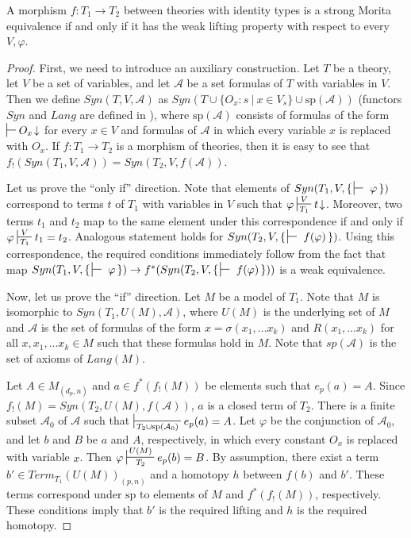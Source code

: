 \documentclass[reqno]{amsart}
\theoremstyle{definition}
\theoremstyle{remark}
\numberwithin{figure}{section}
\begin{document}
\begin{prop}
A morphism $f : T_1 \to T_2$ between theories with identity types is a strong Morita equivalence if and only if it has the weak lifting property with respect to every $V,\varphi$.
\end{prop}
\begin{proof}
First, we need to introduce an auxiliary construction.
Let $T$ be a theory, let $V$ be a set of variables, and let $\mathcal{A}$ be a set formulas of $T$ with variables in $V$.
Then we define $Syn(T,V,\mathcal{A})$ as $Syn(T \cup \{ O_x : s\ |\ x \in V_s \} \cup \mathrm{sp}(\mathcal{A}))$ (functors $Syn$ and $Lang$ are defined in \cite{alg-models}),
where $\mathrm{sp}(\mathcal{A})$ consists of formulas of the form $\sststile{}{} O_x\!\downarrow$ for every $x \in V$
and formulas of $\mathcal{A}$ in which every variable $x$ is replaced with $O_x$.
If $f : T_1 \to T_2$ is a morphism of theories, then it is easy to see that $f_!(Syn(T_1,V,\mathcal{A})) = Syn(T_2,V,f(\mathcal{A}))$.

Let us prove the ``only if'' direction.
Note that elements of $Syn(T_1, V, \{\,\sststile{}{}~\varphi\,\})$ correspond to terms $t$ of $T_1$ with variables in $V$ such that $\varphi \sststile{T_1}{V} t\!\downarrow$.
Moreover, two terms $t_1$ and $t_2$ map to the same element under this correspondence if and only if $\varphi \sststile{T_1}{V} t_1 = t_2$.
Analogous statement holds for $Syn(T_2, V, \{\,\sststile{}{}~f(\varphi)\,\})$.
Using this correspondence, the required conditions immediately follow from the fact that
map $Syn(T_1, V, \{\,\sststile{}{}~\varphi\,\}) \to f^*(Syn(T_2, V, \{\,\sststile{}{}~f(\varphi)\,\}))$ is a weak equivalence.

Now, let us prove the ``if'' direction.
Let $M$ be a model of $T_1$.
Note that $M$ is isomorphic to $Syn(T_1, U(M), \mathcal{A})$, where $U(M)$ is the underlying set of $M$ and $\mathcal{A}$ is the set of formulas of the form
$x = \sigma(x_1, \ldots x_k)$ and $R(x_1, \ldots x_k)$ for all $x, x_1, \ldots x_k \in M$ such that these formulas hold in $M$.
Note that $sp(\mathcal{A})$ is the set of axioms of $Lang(M)$.

Let $A \in M_{(d_p,n)}$ and $a \in f^*(f_!(M))$ be elements such that $e_p(a) = A$.
Since $f_!(M) = Syn(T_2, U(M), f(\mathcal{A}))$, $a$ is a closed term of $T_2$.
There is a finite subset $\mathcal{A}_0$ of $\mathcal{A}$ such that $\sststile{T_2 \cup \mathrm{sp}(\mathcal{A}_0)}{} e_p(a) = A$.
Let $\varphi$ be the conjunction of $\mathcal{A}_0$, and let $b$ and $B$ be $a$ and $A$, respectively, in which every constant $O_x$ is replaced with variable $x$.
Then $\varphi \sststile{T_2}{U(M)} e_p(b) = B$.
By assumption, there exist a term $b' \in Term_{T_1}(U(M))_{(p,n)}$ and a homotopy $h$ between $f(b)$ and $b'$.
These terms correspond under $\mathrm{sp}$ to elements of $M$ and $f^*(f_!(M))$, respectively.
These conditions imply that $b'$ is the required lifting and $h$ is the required homotopy.
\end{proof}
\end{document}
